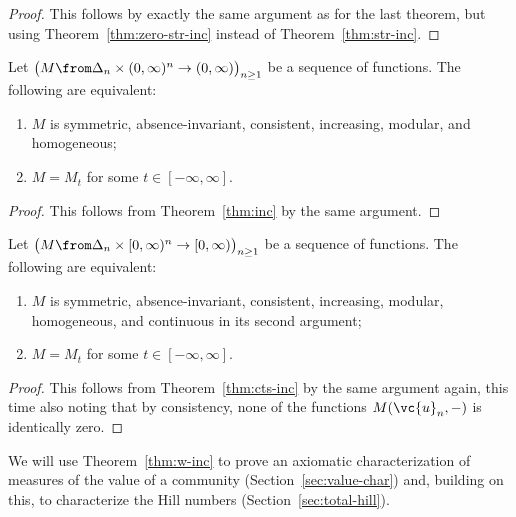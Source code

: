 \begin{proof}
This follows by exactly the same argument as for the last theorem, but
using Theorem~\ref{thm:zero-str-inc} instead of Theorem~\ref{thm:str-inc}.
\end{proof}


\begin{thm}
% 
Let $\bigl( M \from \Delta_n \times (0, \infty)^n \to (0, \infty) \bigr)_{n
  \geq 1}$ be a sequence of functions.  The following are equivalent:
% 
\begin{enumerate}
\item 
$M$ is symmetric, absence-invariant, consistent, increasing, modular, and
  homogeneous;

\item
$M = M_t$ for some $t \in [-\infty, \infty]$.
\end{enumerate}
\end{thm}

\begin{proof}
This follows from Theorem~\ref{thm:inc} by the same argument.
\end{proof}


\begin{thm}
\index{power mean!characterization of!weighted on $[0, \infty)$}
% 
Let $\bigl( M \from \Delta_n \times [0, \infty)^n \to [0, \infty) \bigr)_{n
  \geq 1}$ be a sequence of functions.  The following are equivalent:
% 
\begin{enumerate}
\item 
$M$ is symmetric, absence-invariant, consistent, increasing, modular,
  homogeneous, and continuous in its second argument;

\item
$M = M_t$ for some $t \in [-\infty, \infty]$.
\end{enumerate}
\end{thm}

\begin{proof}
This follows from Theorem~\ref{thm:cts-inc} by the same argument again,
this time also noting that by consistency, none of the functions
$M(\vc{u}_n, -)$ is identically zero.  
\end{proof}

We will use Theorem~\ref{thm:w-inc} to prove an axiomatic characterization
of measures of the value of a community (Section~\ref{sec:value-char}) and,
building on this, to characterize the Hill numbers
(Section~\ref{sec:total-hill}).




